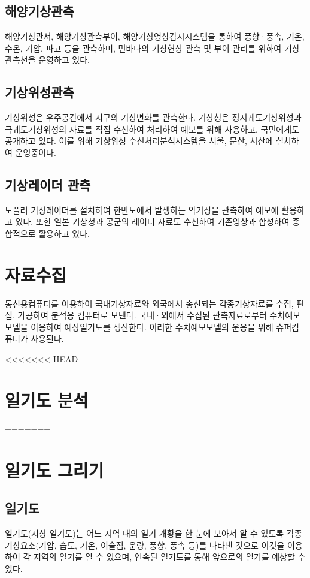 \subsection{해양기상관측}
해양기상관서, 해양기상관측부이, 해양기상영상감시시스템을 통하여 풍향·풍속, 기온, 수온, 기압, 파고 등을 관측하며, 먼바다의 기상현상 관측 및 부이 관리를 위하여 기상관측선을 운영하고 있다.

\subsection{기상위성관측}
기상위성은 우주공간에서 지구의 기상변화를 관측한다. 기상청은 정지궤도기상위성과 극궤도기상위성의 자료를 직접 수신하여 처리하여 예보를 위해 사용하고, 국민에게도 공개하고 있다. 이를 위해 기상위성 수신처리분석시스템을 서울, 문산, 서산에 설치하여 운영중이다.

\subsection{기상레이더 관측}
도플러 기상레이더를 설치하여 한반도에서 발생하는 악기상을 관측하여 예보에 활용하고 있다. 또한 일본 기상청과 공군의 레이더 자료도 수신하여 기존영상과 합성하여 종합적으로 활용하고 있다.


\section{자료수집}
통신용컴퓨터를 이용하여 국내기상자료와 외국에서 송신되는 각종기상자료를 수집, 편집, 가공하여 분석용 컴퓨터로 보낸다. 국내·외에서 수집된 관측자료로부터 수치예보모델을 이용하여 예상일기도를 생산한다. 이러한 수치예보모델의 운용을 위해 슈퍼컴퓨터가 사용된다.

<<<<<<< HEAD
\section{일기도 분석}
=======


\section{일기도 그리기}

\subsection{일기도}
일기도(지상 일기도)는 어느 지역 내의 일기 개황을 한 눈에 보아서 알 수 있도록
각종 기상요소(기압, 습도, 기온, 이슬점, 운량, 풍향, 풍속 등)를 나타낸 것으로 이것을
이용하여 각 지역의 일기를 알 수 있으며, 연속된 일기도를 통해 앞으로의 일기를 예상할 수 있다.

